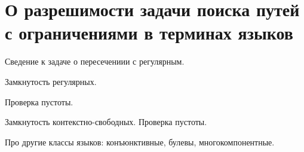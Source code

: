 \section{О разрешимости задачи поиска путей с ограничениями в терминах языков}

Сведение к задаче о пересечениии с регулярным.

Замкнутость регулярных.

Проверка пустоты.

Замкнутость контекстно-свободных.
Проверка пустоты.

Про другие классы языков: конъюнктивные, булевы, многокомпонентные.